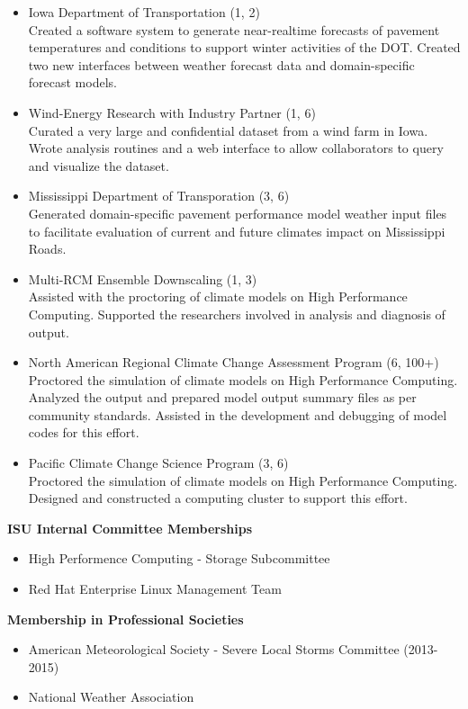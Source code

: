 \begin{itemize}
\item Iowa Department of Transportation (1, 2)\\
Created a software system to generate near-realtime forecasts of pavement
temperatures and conditions to support winter activities of the DOT.  Created
two new interfaces between weather forecast data and domain-specific forecast
models.
\item Wind-Energy Research with Industry Partner (1, 6)\\
Curated a very large and confidential dataset from a wind farm in Iowa. Wrote
analysis routines and a web interface to allow collaborators to query and
visualize the dataset.
\item Mississippi Department of Transporation (3, 6)\\
Generated domain-specific pavement performance model weather input files
to facilitate evaluation of current and future climates impact on 
Mississippi Roads.
\item Multi-RCM Ensemble Downscaling (1, 3)\\
Assisted with the proctoring of climate models on High Performance Computing.
Supported the researchers involved in analysis and diagnosis of output.
\item North American Regional Climate Change Assessment Program (6, 100+)\\
Proctored the simulation of climate models on High Performance Computing.
 Analyzed the output and prepared model output summary files as per 
community standards.  Assisted in the development and debugging of model
codes for this effort.
\item Pacific Climate Change Science Program (3, 6)\\
Proctored the simulation of climate models on High Performance Computing.
Designed and constructed a computing cluster to support this effort.
\end{itemize}
%
\Large \bf ISU Internal Committee Memberships
\normalsize \sf
\begin{itemize}
\item High Performence Computing - Storage Subcommittee
\item Red Hat Enterprise Linux Management Team
\end{itemize}
%
\Large \bf Membership in Professional Societies
\normalsize \sf	
\begin{itemize}
\item American Meteorological Society - Severe Local Storms Committee (2013-2015)
\item National Weather Association
\end{itemize}

